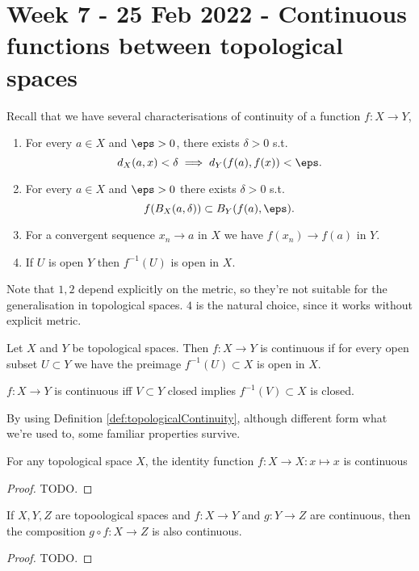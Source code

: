 \section{Week 7 - 25 Feb 2022 - Continuous functions between topological spaces }
Recall that we have several characterisations of continuity of a function
$f:X\to Y$,
\begin{enumerate}
  \item For every $a\in X$ and $\eps>0$, there exists $\delta>0$ s.t. 
    \[d_X(a,x)<\delta \implies d_Y(f(a),f(x))<\eps.\]
  \item For every $a\in X$ and $\eps>0$ there exists $\delta>0$ s.t.
    \[f(B_X(a,\delta))\subset B_Y(f(a),\eps).\]
  \item For a convergent sequence $x_n\to a$ in $X$ we have $f(x_n)\to f(a)$ in
    $Y$.
  \item If $U$ is open $Y$ then $f^{-1}(U)$ is open in $X$.
\end{enumerate}
Note that $1,2$ depend explicitly on the metric, so they're not suitable for the
generalisation in topological spaces. $4$ is the natural choice, since it works
without explicit metric.
\begin{definition}
  Let $X$ and $Y$ be topological spaces. Then $f:X\to Y$ is continuous if for
  every open subset $U\subset Y$ we have the preimage $f^{-1}(U)\subset X$ is
  open in $X$.
  \label{def:topologicalContinuity}
\end{definition}
\begin{exercise}
  $f:X\to Y$ is continuous iff $V\subset Y$ closed implies $f^{-1}(V)\subset X$
  is closed.
\end{exercise}
By using Definition \ref{def:topologicalContinuity}, although different form
what we're used to, some familiar properties survive.

\begin{lemma}
  For any topological space $X$, the identity function $f:X\to X:x\mapsto x$ is
  continuous
  \label{<+label+>}
\end{lemma}
\begin{proof}
  TODO.
\end{proof}
\begin{lemma}
  If $X,Y,Z$ are topoological spaces and $f:X\to Y$ and $g:Y\to Z$ are
  continuous, then the composition $g\circ f:X\to Z$ is also continuous.
  \label{<+label+>}
\end{lemma}
\begin{proof}
  TODO.
\end{proof}

